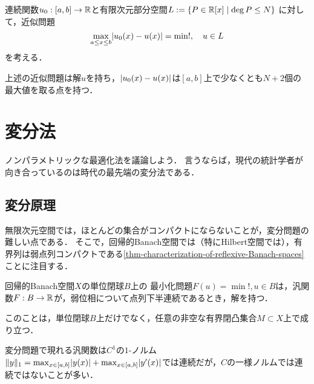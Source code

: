 \documentclass[uplatex,dvipdfmx]{jsreport}
\begin{document}
\begin{definition}
    連続関数$u_0:[a,b]\to\mathbb{R}$と有限次元部分空間$L:=\left\{P\in\mathbb{R}[x]\mid\deg P\le N\right\}$
    に対して，近似問題
    \[\max_{a\le x\le b}\lvert u_0(x)-u(x)\rvert=\min!,\quad u\in L\]
    を考える．
\end{definition}

\begin{proposition}
    上述の近似問題は解$u$を持ち，$\lvert u_0(x)-u(x)\rvert$は$[a,b]$上で少なくとも$N+2$個の最大値を取る点を持つ．
\end{proposition}

\section{変分法}

\begin{tcolorbox}[colframe=ForestGreen, colback=ForestGreen!10!white,breakable,colbacktitle=ForestGreen!40!white,coltitle=black,fonttitle=\bfseries\sffamily,
title=]
    ノンパラメトリックな最適化法を議論しよう．
    言うならば，現代の統計学者が向き合っているのは時代の最先端の変分法である．
\end{tcolorbox}

\subsection{変分原理}

\begin{tcolorbox}[colframe=ForestGreen, colback=ForestGreen!10!white,breakable,colbacktitle=ForestGreen!40!white,coltitle=black,fonttitle=\bfseries\sffamily,
title=]
    無限次元空間では，ほとんどの集合がコンパクトにならないことが，変分問題の難しい点である．
    そこで，回帰的Banach空間では（特にHilbert空間では），有界列は弱点列コンパクトである\ref{thm-characterization-of-reflexive-Banach-spaces}ことに注目する．
\end{tcolorbox}

\begin{theorem}
    回帰的Banach空間$X$の単位閉球$B$上の
    最小化問題$F(u)=\min!,u\in B$は，汎関数$F:B\to\mathbb{R}$が，弱位相について点列下半連続であるとき，解を持つ．

    このことは，単位閉球$B$上だけでなく，任意の非空な有界閉凸集合$M\subset X$上で成り立つ．
\end{theorem}

\begin{remark}
    変分問題で現れる汎関数は$C^1$の$1$-ノルム$\|y\|_1=\max_{x\in[a,b]}\lvert y(x)\rvert+\max_{x\in[a,b]}\lvert y'(x)\rvert$では連続だが，$C$の一様ノルムでは連続ではないことが多い．
\end{remark}
\end{document}
